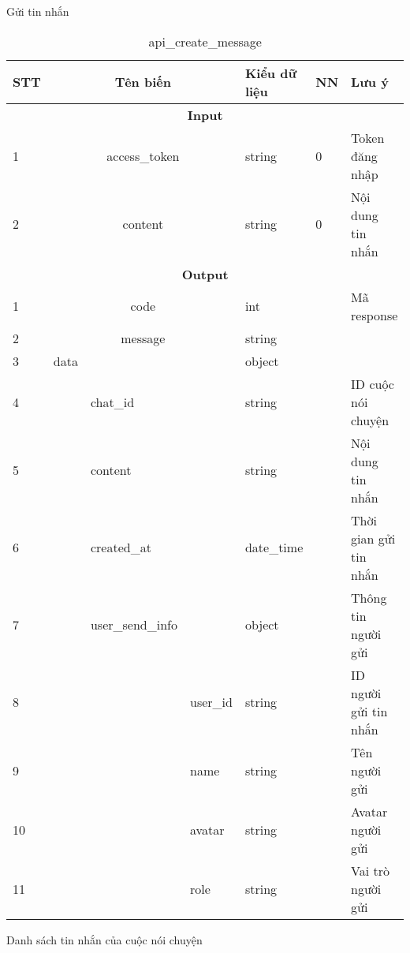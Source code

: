\documentclass[../DoAn.tex]{subfiles}
\begin{document}
Gửi tin nhắn
    \begin{longtable}{| p{} | p{}| p{} | p{} |p{} | p{}| p{} |  } 
    \caption{api\_create\_message}
    \label{banga37}
    \endfirsthead
    \endhead
    \hline
    \bfseries STT & \multicolumn{3}{c|}{\bfseries Tên biến}& \bfseries Kiểu dữ liệu &\bfseries NN &\bfseries Lưu ý\\\hline
    \multicolumn{7}{|c|}{\bfseries Input}\\\hline
    1  & \multicolumn{3}{c|}{access\_token}& string & 0 & Token đăng nhập\\\hline
    2  & \multicolumn{3}{c|}{content}& string & 0 & Nội dung tin nhắn\\\hline
    \multicolumn{7}{|c|}{\bfseries Output}\\\hline
    1  & \multicolumn{3}{c|}{code}& int &  & Mã response\\\hline
    2  & \multicolumn{3}{c|}{message}& string &  & \\\hline
    3  & data & & & object &  & \\\cline{1-1}\cline{3-7}
    4  & \multirow{10}{*}{}    & chat\_id & & string &  & ID cuộc nói chuyện\\\cline{1-1}\cline{3-7}
    5 &      & content   &  & string &  & Nội dung tin nhắn\\\cline{1-1}\cline{3-7}
    6 &      & created\_at   &  & date\_time &  & Thời gian gửi tin nhắn\\\cline{1-1}\cline{3-7}
    7  & \multirow{10}{*}{}    & user\_send\_info & & object &  & Thông tin người gửi\\\cline{1-1}\cline{4-7}
    8 &      &      & user\_id & string &  & ID người gửi tin nhắn\\\cline{1-1}\cline{4-7}
    9 &      &      & name & string &  & Tên người gửi\\\cline{1-1}\cline{4-7}
    10 &      &      & avatar & string &  & Avatar người gửi\\\cline{1-1}\cline{4-7}
    11 &      &      & role & string &  & Vai trò người gửi\\\hline
    \end{longtable}
\newpage
Danh sách tin nhắn của cuộc nói chuyện
\end{document}
